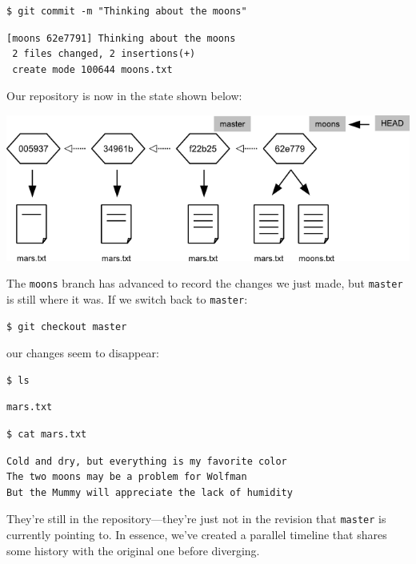 \documentclass{book}
\begin{document}
\begin{verbatim}
$ git commit -m "Thinking about the moons"
\end{verbatim}

\begin{verbatim}
[moons 62e7791] Thinking about the moons
 2 files changed, 2 insertions(+)
 create mode 100644 moons.txt
\end{verbatim}

Our repository is now in the state shown below:

\includegraphics{novice/extras/img/git-branching-04.png}

The \texttt{moons} branch has advanced to record the changes we just
made, but \texttt{master} is still where it was. If we switch back to
\texttt{master}:

\begin{verbatim}
$ git checkout master
\end{verbatim}

our changes seem to disappear:

\begin{verbatim}
$ ls
\end{verbatim}

\begin{verbatim}
mars.txt
\end{verbatim}

\begin{verbatim}
$ cat mars.txt
\end{verbatim}

\begin{verbatim}
Cold and dry, but everything is my favorite color
The two moons may be a problem for Wolfman
But the Mummy will appreciate the lack of humidity
\end{verbatim}

They're still in the repository---they're just not in the revision that
\texttt{master} is currently pointing to. In essence, we've created a
parallel timeline that shares some history with the original one before
diverging.
\end{document}
